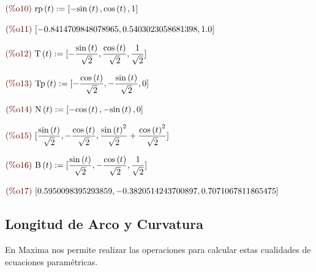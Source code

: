 \documentclass[12pt]{article}
\begin{document}
\begin{math}\displaystyle
\parbox{8ex}{\color{labelcolor}(\%o10) }
\mathrm{rp}\left( t\right) :=[-\mathrm{sin}\left( t\right) ,\mathrm{cos}\left( t\right) ,1]
\end{math}

\begin{math}\displaystyle
\parbox{8ex}{\color{labelcolor}(\%o11) }
[-0.8414709848078965,0.5403023058681398,1.0]
\end{math}

\begin{math}\displaystyle
\parbox{8ex}{\color{labelcolor}(\%o12) }
\mathrm{T}\left( t\right) :=[-\frac{\mathrm{sin}\left( t\right) }{\sqrt{2}},\frac{\mathrm{cos}\left( t\right) }{\sqrt{2}},\frac{1}{\sqrt{2}}]
\end{math}

\begin{math}\displaystyle
\parbox{8ex}{\color{labelcolor}(\%o13) }
\mathrm{Tp}\left( t\right) :=[-\frac{\mathrm{cos}\left( t\right) }{\sqrt{2}},-\frac{\mathrm{sin}\left( t\right) }{\sqrt{2}},0]
\end{math}

\begin{math}\displaystyle
\parbox{8ex}{\color{labelcolor}(\%o14) }
\mathrm{N}\left( t\right) :=[-\mathrm{cos}\left( t\right) ,-\mathrm{sin}\left( t\right) ,0]
\end{math}

\begin{math}\displaystyle
\parbox{8ex}{\color{labelcolor}(\%o15) }
[\frac{\mathrm{sin}\left( t\right) }{\sqrt{2}},-\frac{\mathrm{cos}\left( t\right) }{\sqrt{2}},\frac{{\mathrm{sin}\left( t\right) }^{2}}{\sqrt{2}}+\frac{{\mathrm{cos}\left( t\right) }^{2}}{\sqrt{2}}]
\end{math}

\begin{math}\displaystyle
\parbox{8ex}{\color{labelcolor}(\%o16) }
\mathrm{B}\left( t\right) :=[\frac{\mathrm{sin}\left( t\right) }{\sqrt{2}},-\frac{\mathrm{cos}\left( t\right) }{\sqrt{2}},\frac{1}{\sqrt{2}}]
\end{math}

\begin{math}\displaystyle
\parbox{8ex}{\color{labelcolor}(\%o17) }
[0.5950098395293859,-0.3820514243700897,0.7071067811865475]
\end{math}


\subsection{Longitud de Arco y Curvatura}
En Maxima nos permite realizar las operaciones para calcular estas cualidades de ecuaciones paramétricas.
\end{document}
